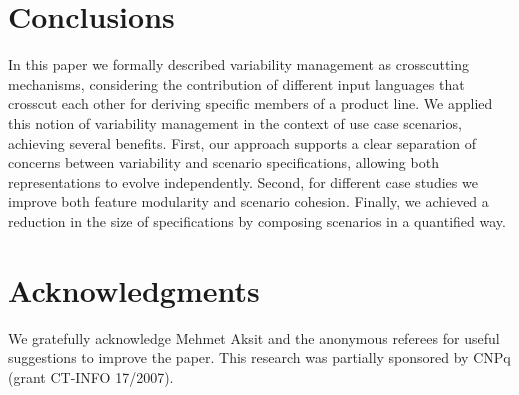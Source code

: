 \section{Conclusions}\label{sec:conclusions}

In this paper we formally described variability management as crosscutting
mechanisms, considering the contribution of different input languages that
crosscut each other for deriving specific members of a product line. We applied
this notion of variability management in the context of use case scenarios,
achieving several benefits. First, our approach supports a clear separation of
concerns between variability and scenario specifications, allowing both
representations to evolve independently. Second, for different case studies we
improve both feature modularity and scenario cohesion. Finally, we achieved a
reduction in the size of specifications by composing scenarios in a quantified
way. 




\section{Acknowledgments}
We gratefully acknowledge Mehmet Aksit and the anonymous referees
for useful suggestions to improve the paper. This research was partially
sponsored by CNPq (grant CT-INFO 17/2007). 

